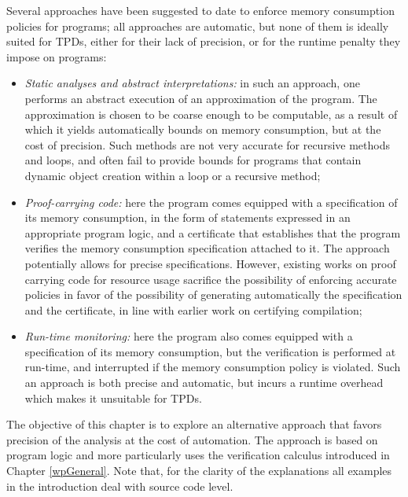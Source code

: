 Several approaches have been suggested to date to enforce memory
consumption policies for programs; all approaches are automatic,
but none of them is ideally suited for TPDs, either for their
lack of precision, or for the runtime penalty they impose on
programs:
\begin{itemize}
\item \emph{Static analyses and abstract interpretations:} in such an
approach, one performs an abstract execution of an approximation of
the program. The approximation is chosen to be coarse enough to be
computable, as a result of which it yields automatically bounds on
memory consumption, but at the cost of precision. Such methods are not
very accurate for recursive methods and loops, and often fail to
provide bounds for programs that contain dynamic object creation
within a loop or a recursive method;


\item \emph{Proof-carrying code:} here the program
comes equipped with a specification of its memory consumption, in the
form of statements expressed in an appropriate program logic, and a
certificate that establishes that the program verifies the memory
consumption specification attached to it. The approach potentially
allows for precise specifications. However, existing works on proof
carrying code for resource usage sacrifice the possibility of
enforcing accurate policies in favor of the possibility of generating
automatically the specification and the certificate, in line with
earlier work on certifying compilation;

\item \emph{Run-time monitoring:}  here the program
also comes equipped with a specification of its memory consumption, 
but the verification is performed at run-time, and interrupted if
the memory consumption policy is violated. Such an approach is both
 precise and automatic, but incurs a runtime overhead which 
makes it unsuitable for TPDs.
\end{itemize}
The objective of this chapter is to explore an alternative approach that
favors precision of the analysis at the cost of automation.
 The approach is based on program logic and more particularly uses
the verification calculus introduced in Chapter \ref{wpGeneral}.
Note that,  for the clarity of the explanations all
examples in the introduction deal with source code level.

